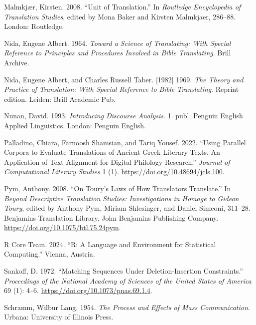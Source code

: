 \documentclass[
  letterpaper,
  DIV=11,
  numbers=noendperiod]{scrartcl}
\newlength{\cslhangindent}
\newenvironment{CSLReferences}[2] %
 {\begin{list}{}{%
  \setlength{\itemindent}{0pt}
  \setlength{\leftmargin}{0pt}
  \setlength{\parsep}{0pt}
  \ifodd #1
   \setlength{\leftmargin}{\cslhangindent}
   \setlength{\itemindent}{-1\cslhangindent}
  \fi
  \setlength{\itemsep}{#2\baselineskip}}}
 {\end{list}}
\begin{document}
\begin{CSLReferences}{1}{0}
Malmkjær, Kirsten. 2008. {``Unit of {Translation}.''} In \emph{Routledge
{Encyclopedia} of {Translation Studies}}, edited by Mona Baker and
Kirsten Malmkjaer, 286--88. London: Routledge.

Nida, Eugene Albert. 1964. \emph{Toward a {Science} of {Translating}:
{With Special Reference} to {Principles} and {Procedures Involved} in
{Bible Translating}}. Brill Archive.

Nida, Eugene Albert, and Charles Russell Taber. {[}1982{]} 1969.
\emph{The {Theory} and {Practice} of {Translation}: {With Special
Reference} to {Bible Translating}}. Reprint edition. Leiden: Brill
Academic Pub.

Nunan, David. 1993. \emph{Introducing Discourse Analysis}. 1. publ.
Penguin {English} Applied Linguistics. London: Penguin English.

Palladino, Chiara, Farnoosh Shamsian, and Tariq Yousef. 2022. {``Using
{Parallel Corpora} to {Evaluate Translations} of {Ancient Greek Literary
Texts}. {An Application} of {Text Alignment} for {Digital Philology
Research}.''} \emph{Journal of Computational Literary Studies} 1 (1).
\url{https://doi.org/10.48694/jcls.100}.

Pym, Anthony. 2008. {``On {Toury}'s Laws of How Translators
Translate.''} In \emph{Beyond {Descriptive Translation Studies}:
{Investigations} in Homage to {Gideon Toury}}, edited by Anthony Pym,
Miriam Shlesinger, and Daniel Simeoni, 311--28. Benjamins {Translation
Library}. John Benjamins Publishing Company.
\url{https://doi.org/10.1075/btl.75.24pym}.

R Core Team. 2024. {``R: {A Language} and {Environment} for {Statistical
Computing}.''} Vienna, Austria.

Sankoff, D. 1972. {``Matching Sequences Under Deletion-Insertion
Constraints.''} \emph{Proceedings of the National Academy of Sciences of
the United States of America} 69 (1): 4--6.
\url{https://doi.org/10.1073/pnas.69.1.4}.

Schramm, Wilbur Lang. 1954. \emph{The Process and Effects of Mass
Communication}. Urbana: University of Illinois Press.


\end{CSLReferences}
\end{document}
